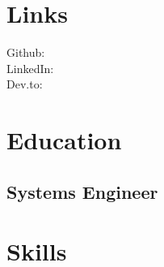 \documentclass[]{deedy-resume-openfont}
\begin{document}
%
%


%
%



%
%

\begin{minipage}[t]{0.33\textwidth} 


\section{Links} 
Github: \href{https://github.com/JCatrielLopez}{} \\
LinkedIn: \href{https://www.linkedin.com/in/JCatrielLopez/}{} \\
Dev.to: \href{https://dev.to/catriel}{} \\
\sectionsep


\section{Education} 

\subsection{Systems Engineer}

%
%
\sectionsep



\section{Skills}

\end{minipage}
\end{document}
